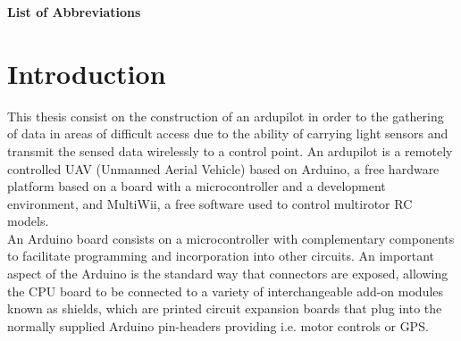 \documentclass[12pt, a4paper,twoside]{tesi_upf}
\begin{document}
\cleardoublepage

%


\tableofcontents

\listoffigures

\listoftables

\cleardoublepage
\thispagestyle{empty}
\vspace*{1.95cm} \hspace*{-0.155cm} %
\textbf{{\huge \sffamily List of Abbreviations}\\}
\vspace*{0.5cm}         
\begin{acronym}
\end{acronym}

\mainmatter
\chapter{Introduction}

This thesis consist on the construction of an ardupilot in order to the gathering of data in areas of difficult access due to the ability of carrying light sensors and transmit the sensed data wirelessly to a control point. An ardupilot is a remotely controlled UAV (Unmanned Aerial Vehicle)  based on Arduino, a free hardware platform based on a board with a microcontroller and a development environment, and MultiWii, a free software used to control multirotor RC models. 
\\[12pt]

An Arduino board consists on a microcontroller with complementary components to facilitate programming and incorporation into other circuits. An important aspect of the Arduino is the standard way that connectors are exposed, allowing the CPU board to be connected to a variety of interchangeable add-on modules known as shields, which are printed circuit expansion boards that plug into the normally supplied Arduino pin-headers providing i.e. motor controls or GPS.
\\[12pt]
\end{document}
